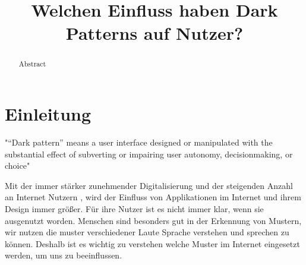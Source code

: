 \documentclass[conference,compsoc,final,a4paper]{IEEEtran}
\newcommand{\autoren}[0]{Karhan, Marvin}
\newcommand{\dokumententitel}[0]{Welchen Einfluss haben Dark Patterns auf Nutzer?}
\begin{document}
\title{\dokumententitel}

\author{
  \IEEEauthorblockN{\autoren}
}

\maketitle
\thispagestyle{plain}
\pagestyle{plain}


\begin{abstract}
Abstract
\end{abstract}

{\small\tableofcontents}

\section{Einleitung}
"“Dark pattern” means a user interface designed or manipulated with the substantial effect of subverting or impairing user autonomy, decisionmaking, or choice"

Mit der immer stärker zunehmender Digitalisierung und der steigenden Anzahl an Internet Nutzern \autocite{ITU2020}, wird der Einfluss von Applikationen im Internet und ihrem Design immer größer. Für ihre Nutzer ist es nicht immer klar, wenn sie ausgenutzt worden. Menschen sind besonders gut in der Erkennung von Mustern, wir nutzen die muster verschiedener Laute Sprache verstehen und sprechen zu können. Deshalb ist es wichtig zu verstehen welche Muster im Internet eingesetzt werden, um uns zu beeinflussen.
\end{document}
